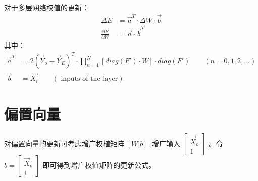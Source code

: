 \documentclass{article}
\begin{document}
对于多层网络权值的更新：
\begin{align*}
\Delta E &= \vec{a}^T\cdot\Delta W\cdot \vec{b} \\
\frac{\partial E}{\partial W} &= \vec{a}\cdot\vec b^T
\end{align*}
其中：
\begin{align*}
\vec{a}^T&=2(\vec Y_o-\vec Y_E)^T\cdot \prod_{n=1}^{N}[diag(F') \cdot W ]\cdot diag(F') \qquad (n=0,1,2,\ldots)\\
\vec{b}&=\vec{X_i}\qquad (\text{ inputs of the layer})
\end{align*}


\section{偏置向量}
对偏置向量的更新可考虑增广权植矩阵 $[W|b]$ ,增广输入 $\begin{bmatrix} \vec X_o  \\ 1\end{bmatrix}$ 。令 $b=\begin{bmatrix} \vec X_o \\ 1\end{bmatrix}$ 即可得到增广权值矩阵的更新公式。
\end{document}
